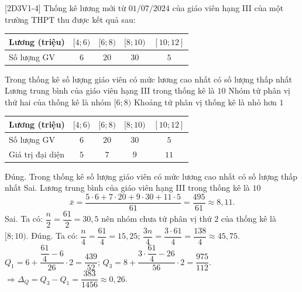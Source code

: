 \begin{ex}%
[2D3V1-4]%
	Thống kê lương mới từ $01/07/2024$ của giáo viên hạng III của một trường THPT thu được kết quả sau:
	\begin{center}
		\begin{tabular}{|l|c|c|c|c|}
			\hline
			Lương (triệu) & $[4;6)$ & $[6;8)$ & $[8;10)$ & $[10;12]$\\
			\hline
			Số lượng GV & $6$ & $20$ & $30$ & $5$\\
			\hline
		\end{tabular}
	\end{center}
	\choiceTF
	{\True Trong thống kê số lượng giáo viên có mức lương cao nhất có số lượng thấp nhất}
	{Lương trung bình của giáo viên hạng III trong thống kê là $10$}
	{Nhóm tứ phân vị thứ hai của thống kê là nhóm $[6;8)$}
	{\True Khoảng tứ phân vị thống kê là nhỏ hơn $1$}
	\loigiai
	{
		\begin{center}
			\begin{tabular}{|l|c|c|c|c|}
				\hline
				Lương (triệu) & $[4;6)$ & $[6;8)$ & $[8;10)$ & $[10;12]$\\
				\hline
				Số lượng GV & $6$ & $20$ & $30$ & $5$\\
				\hline
				Giá trị đại diện & $5$ & $7$ & $9$ & $11$\\
				\hline
			\end{tabular}
		\end{center}
		\begin{itemchoice}
			\itemch Đúng. Trong thống kê số lượng giáo viên có mức lương cao nhất có số lượng thấp nhất
			\itemch Sai. Lương trung bình của giáo viên hạng III trong thống kê là $10$
			$$
			\bar{x}=\dfrac{5\cdot 6+7\cdot 20+9\cdot 30+11\cdot 5}{61}=\dfrac{495}{61} \approx 8{,}11.
			$$
			\itemch Sai. Ta có: $\dfrac{n}{2}=\dfrac{61}{2}=30{,}5$ nên nhóm chưa tứ phân vị thứ $2$ của thống kê là $[8;10)$.
			\itemch Đúng. Ta có: $\dfrac{n}{4}=\dfrac{61}{4}=15{,}25$; $\dfrac{3n}{4}=\dfrac{3\cdot 61}{4}=\dfrac{138}{4} \approx 45{,}75$.\\
			$Q_1=6+\dfrac{\dfrac{61}{4}-6}{26} \cdot 2=\dfrac{439}{52}$; $Q_3=8+\dfrac{3 \cdot \dfrac{61}{4}-26}{56} \cdot 2=\dfrac{975}{112}$.\\
			$\Rightarrow \Delta_Q=Q_3-Q_1=\dfrac{383}{1456} \approx 0{,}26$.
		\end{itemchoice}
	}
\end{ex}

